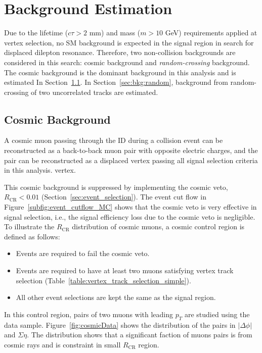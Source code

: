 \chapter{Background Estimation}
\label{chap:bkg}

Due to the lifetime ($c\tau > 2$ mm) and mass ($m > 10$ GeV) requirements applied at vertex selection, no SM background is expected in the signal region in search for displaced dilepton resonance. Therefore, two non-collision backgrounds are considered in this search: cosmic background and \textit{random-crossing} background. The cosmic background is the dominant background in this analysis and is estimated In Section~\ref{sec:bkg:cosmic}. In Section~\ref{sec:bkg:random}, background from random-crossing of two uncorrelated tracks are estimated.


\section{Cosmic Background}
\label{sec:bkg:cosmic}

A cosmic muon passing through the ID during a collision event can be reconstructed as a back-to-back muon pair with opposite electric charges, and the pair can be reconstructed as a displaced \mumu vertex passing all signal selection criteria in this analysis. \mumu vertex.

This cosmic background is suppressed by implementing the cosmic veto, $R_{\mathrm{CR}} < 0.01$ (Section~\ref{sec:event_selection}). The event cut flow in Figure~\ref{subfig:event_cutflow_MC} shows that the cosmic veto is very effective in signal selection, i.e., the signal efficiency loss due to the cosmic veto is negligible. To illustrate the $R_{\mathrm{CR}}$ distribution of cosmic muons, a cosmic control region is defined as follows:

\begin{itemize}
  \item Events are required to fail the cosmic veto.
  \item Events are required to have at least two muons satisfying vertex track selection (Table~\ref{table:vertex_track_selection_simple}).
  \item All other event selections are kept the same as the signal region.
\end{itemize}

In this control region, pairs of two muons with leading $p_{T}$ are studied using the data sample. Figure~\ref{fig:cosmicData} shows the distribution of the pairs in $|\Delta\phi|$ and $\Sigma \eta$. The distribution shows that a significant faction of muons pairs is from cosmic rays and is constraint in small $R_{\mathrm{CR}}$ region.

